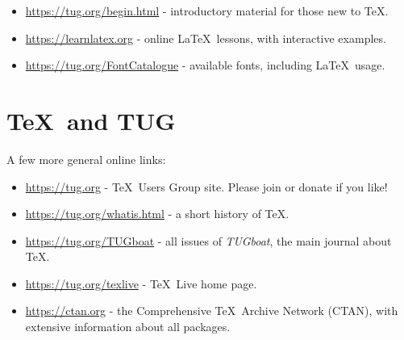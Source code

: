 \documentclass[11pt, oneside]{article}
\begin{document}
\begin{itemize}
\item \url{https://tug.org/begin.html} - introductory material for those
new to \TeX.

\item \url{https://learnlatex.org} - online \LaTeX\ lessons, with
interactive examples.

\item \url{https://tug.org/FontCatalogue} - available fonts, including
\LaTeX\ usage.

\end{itemize}


\section{\TeX\ and TUG}

A few more general online links:

\begin{itemize}
	
\item \url{https://tug.org} - \TeX\ Users Group site. Please join or
donate if you like!

\item \url{https://tug.org/whatis.html} - a short history of \TeX.

\item \url{https://tug.org/TUGboat} - all issues of \textsl{TUGboat},
the main journal about \TeX.

\item \url{https://tug.org/texlive} - \TeX\ Live home page.

\item \url{https://ctan.org} - the Comprehensive \TeX\ Archive Network
(CTAN), with extensive information about all packages.

\end{itemize}
\end{document}
